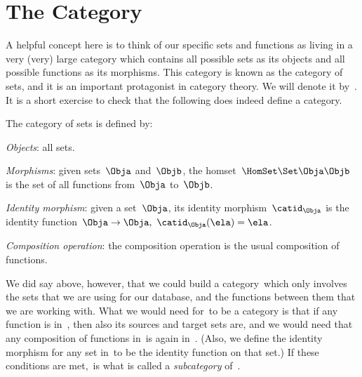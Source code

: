 

\section{The Category \Set}

A helpful concept here is to think of our specific sets and functions as living in a very (very) large category which contains all possible sets as its objects and all possible functions as its morphisms. This category is known as the category of sets, and it is an important protagonist in category theory. We will denote it by~\Set. It is a short exercise to check that the following does indeed define a category.

\begin{ctdefinition}
  \label{def:Set}
  The category of sets \iindex{\Set} is defined by:
  \begin{compactenum}
    \item \emph{Objects}: all sets.
    \item \emph{Morphisms}: given sets~$\Obja$ and~$\Objb$, the homset~$\HomSet\Set \Obja \Objb$ is the set of all functions from~$\Obja$ to~$\Objb$.
    \item \emph{Identity morphism}: given a set~$\Obja$, its identity morphism~$\catid_\Obja$ is the identity function~$\Obja \to \Obja, \ \catid_\Obja(\ela) = \ela$.
    \item \emph{Composition operation}: the composition operation is the usual composition of functions.
  \end{compactenum}
\end{ctdefinition}

We did say above, however, that we could build a category~\Database which only involves the sets that we are using for our database, and the functions between them that we are working with. What we would need for~\Database to be a category is that if any function is in~\Database, then also its sources and target sets are, and we would need that any composition of functions in~\Database is again in~\Database. (Also, we define the identity morphism for any set in~\Database to be the identity function on that set.) If these conditions are met,~\Database is what is called a \emph{subcategory} of~\Set.
